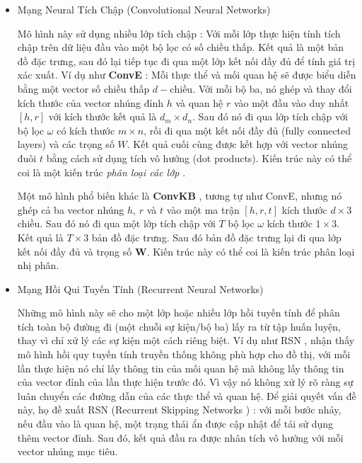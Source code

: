 \begin{itemize}
	\item Mạng Neural Tích Chập (Convolutional Neural Networks)
	
	Mô hình này sử dụng nhiều lớp tích chập : Với mỗi lớp thực hiện tính tích chập trên dữ liệu đầu vào một bộ lọc có số chiều thấp. Kết quả là một bản đồ đặc trưng, sau đó lại tiếp tục đi qua một lớp kết nối đầy đủ để tính giá trị xác xuất. Ví dụ như \textbf{ConvE} \cite{dettmers2017convolutional} : Mỗi thực thể và mối quan hệ sẽ được biểu diễn bằng một vector số chiều thấp $d-\text{chiều}$. Với mỗi bộ ba, nó ghép và thay đổi kích thước của vector nhúng đỉnh $h$ và quan hệ $r$ vào một đầu vào duy nhất $[h, r]$ với kích thước kết quả là $d_m \times d_n$. Sau đó nó đi qua lớp tích chập với bộ lọc $\omega$ có kích thước $m \times n$, rồi đi qua một kết nối đầy đủ  (fully connected layers) và các trọng số $W$. Kết quả cuối cùng được kết hợp với vector nhúng đuôi $t$ bằng cách sử dụng tích vô hướng (dot products). Kiến trúc này có thể coi là một kiến trúc \textit{phân loại các lớp} .
	
	Một mô hình phổ biến khác là \textbf{ConvKB} \cite{nguyen2017novel}, tương tự như ConvE, nhưng nó ghép cả ba vector nhúng $h$, $r$ và $t$ vào một ma trận $[h, r, t]$ kích thước $d \times 3$ chiều. Sau đó nó đi qua một lớp tích chập với $T$ bộ lọc $\omega$ kích thước $1 \times 3$. Kết quả là $T \times 3$ bản đồ đặc trưng. Sau đó bản đồ đặc trưng lại đi qua lớp kết nối đầy đủ và trọng số $\mathbf{W}$. Kiến trúc này có thể coi là kiến trúc phân loại nhị phân.
	
	\item Mạng Hồi Qui Tuyến Tính (Recurrent Neural Networks)
	
	Những mô hình này sẽ cho một lớp hoặc nhiều lớp hồi tuyến tính để phân tích toàn bộ đường đi (một chuỗi sự kiện/bộ ba) lấy ra từ tập huấn luyện, thay vì chỉ xử lý các sự kiện một cách riêng biệt. Ví dụ như RSN \cite{guo2019learning}, nhận thấy mô hình hồi quy tuyến tính truyền thống không phù hợp cho đồ thị, với mỗi lần thực hiện nó chỉ lấy thông tin của mối quan hệ mà không lấy thông tin của vector đỉnh của lần thực hiện trước đó. Vì vậy nó không xử lý rõ ràng sự luân chuyển các đường dẫn của các thực thể và quan hệ. Để giải quyết vấn đề này, họ đề xuất RSN (Recurrent Skipping Networks \cite{guo2019learning}) : với mỗi bước nhảy, nếu đầu vào là quan hệ, một trạng thái ẩn được cập nhật để tái sử dụng thêm vector đỉnh. Sau đó, kết quả đầu ra được nhân tích vô hướng với mỗi vector nhúng mục tiêu.
	

\end{itemize}
